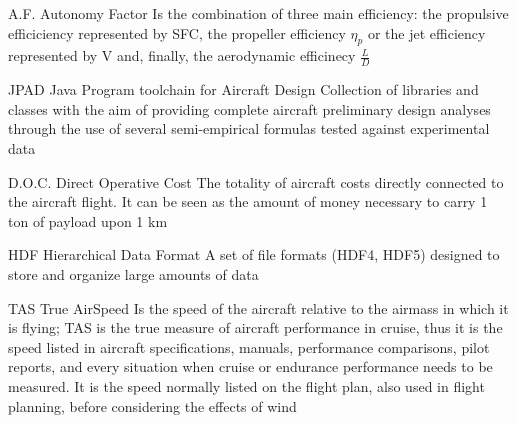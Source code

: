 %
%



  {A.F.}            %
  {Autonomy Factor}  %
  {Is the combination of three main efficiency: the propulsive efficiciency represented by SFC, the propeller efficiency $\eta_{p}$ or the jet efficiency represented by V and, finally, the aerodynamic efficinecy $\frac{L}{D}$} %

  {JPAD}            %
  {Java Program toolchain for Aircraft Design}  %
  {Collection of libraries and classes with the aim of providing complete aircraft preliminary design analyses through the use of several semi-empirical formulas tested against experimental data} %


%
  {D.O.C.}            %
  {Direct Operative Cost}  %
  {The totality of aircraft costs directly connected to the aircraft flight. It can be seen as the amount of money necessary to carry 1 ton of payload upon 1 km}

%
  {HDF}            %
  {Hierarchical Data Format}  %
  {A set of file formats (HDF4, HDF5) designed to store and organize large amounts of data}
  
%
  {TAS}            %
  {True AirSpeed}  %
  {Is the speed of the aircraft relative to the airmass in which it is flying; TAS is the true measure of aircraft performance in cruise, thus it is the speed listed in aircraft specifications, manuals, performance comparisons, pilot reports, and every situation when cruise or endurance performance needs to be measured. It is the speed normally listed on the flight plan, also used in flight planning, before considering the effects of wind}
  
